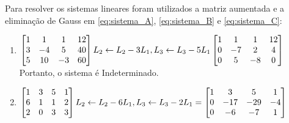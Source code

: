 \begin{resol}
        \begin{flushleft}
         Para resolver os sistemas lineares foram utilizados a matriz aumentada e a eliminação de Gauss em \ref{eq:sistema_A},
        \ref{eq:sistema_B} e \ref{eq:sistema_C}:
        \end{flushleft}
        \begin{enumerate}
            \item\begin{math}
                    \begin{bmatrix}
                        1 & 1 & 1 & 12 \\
                        3 & -4& 5 & 40 \\
                        5 & 10& -3& 60
                    \end{bmatrix} \\
                        L_{2} \leftarrow L_{2} - 3L_{1}, \\
                        L_{3} \leftarrow L_{3} - 5L_{1} \\
                    \begin{bmatrix}
                        1 & 1 & 1 & 12 \\
                        0 & -7& 2 & 4 \\
                        0 & 5 & -8& 0
                    \end{bmatrix} \\
            \end{math}
             Portanto, o sistema é Indeterminado.
            \item \begin{math}
                    \begin{bmatrix}
                        1 & 3 & 5 & 1 \\
                        6 & 1 & 1 & 2 \\
                        2 & 0 & 3 & 3
                    \end{bmatrix}
                        L_{2} \leftarrow L_{2} - 6L_{1},
                        L_{3} \leftarrow L_{3} - 2L_{1}
                        =
                    \left[\begin{matrix}
                        1 & 3 & 5 & 1 \\
                        0 & -17& -29& -4 \\
                        0 & -6& -7& 1
                    \end{matrix} \right] \\

\end{math}
\end{enumerate}
\end{resol}
